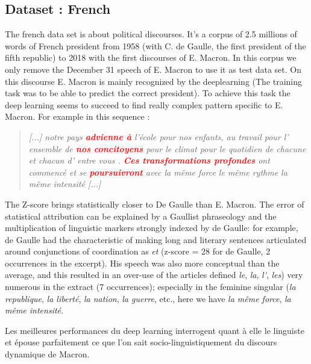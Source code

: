 \subsection{Dataset : French}

The french data set is about political discourses. It's a corpus of 2.5 millions of words of French president from 1958 (with C. de Gaulle, the first president of the fifth republic) to 2018 with the first discourses of E. Macron. In this corpus we only remove the December 31 speech of E. Macron to use it as test data set. On this discourse E. Macron is mainly recognized by the deeplearning (The training task was to be able to predict the correct president). To achieve this task the deep learning seems to succeed to find really complex pattern specific to E. Macron. For example in this sequence :

\begin{quote}
\textit{[...] notre pays \textcolor{red}{\textbf{advienne à}} l'école pour nos enfants, au travail pour l' ensemble de \textcolor{red}{\textbf{nos concitoyens}} pour le climat pour le quotidien de chacune et chacun d' entre vous . \textcolor{red}{\textbf{Ces transformations profondes}} ont commencé et se \textcolor{red}{\textbf{poursuivront}} avec la même force le même rythme la même intensité [...]} 
\end{quote}

The Z-score brings statistically closer to De Gaulle than E. Macron. The error of statistical attribution can be explained by a Gaullist phraseology and the multiplication of linguistic markers strongly indexed by de Gaulle: for example, de Gaulle had the characteristic of making long and literary sentences articulated around conjunctions of coordination as \textit{et} (z-score = 28 for de Gaulle, 2 occurrences in the excerpt). His speech was also more conceptual than the average, and this resulted in an over-use of the articles defined \textit{le}, \textit{la}, \textit{l\'}, \textit{les}) very numerous in the extract (7 occurrences); especially in the feminine singular (\textit{la republique}, \textit{la liberté}, \textit{la nation}, \textit{la guerre}, etc., here we have \textit{la même force}, \textit{la même intensité}.

Les meilleures performances du deep learning interrogent quant à elle le linguiste et épouse parfaitement ce que l'on sait socio-linguistiquement du discours dynamique de Macron.

